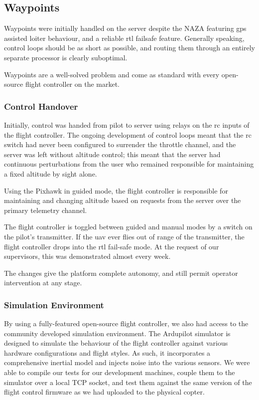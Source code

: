\documentclass[a4paper, 11pt, titlepage]{article}
\begin{document}
    \subsection{Waypoints}
      Waypoints were initially handled on the server despite the NAZA featuring \gls{gps} assisted loiter behaviour, and a reliable \gls{rtl} failsafe feature.  Generally speaking, control loops should be as short as possible, and routing them through an entirely separate processor is clearly suboptimal.
      
      Waypoints are a well-solved problem and come as standard with every open-source flight controller on the market.

    \subsubsection{Control Handover}
      Initially, control was handed from pilot to server using relays on the \gls{rc} inputs of the flight controller.  The ongoing development of control loops meant that the \gls{rc} switch had never been configured to surrender the throttle channel, and the server was left without altitude control;  this meant that the server had continuous perturbations from the user who remained responsible for maintaining a fixed altitude by sight alone.

      Using the Pixhawk \cite{3dr-pixhawk} in guided mode, the flight controller is responsible for maintaining and changing altitude based on requests from the server over the primary telemetry channel.
      
      The flight controller is toggled between guided and manual modes by a switch on the pilot's transmitter.  If the \gls{uav} ever flies out of range of the transmitter, the flight controller drops into the \gls{rtl} fail-safe mode.  At the request of our supervisors, this was demonstrated almost every week.

      The changes give the platform complete autonomy, and still permit operator intervention at any stage.

    \subsubsection{Simulation Environment}
      By using a fully-featured open-source flight controller, we also had access to the community developed simulation environment.  
      The Ardupilot simulator is designed to simulate the behaviour of the flight controller against various hardware configurations and flight styles.  As such, it incorporates a comprehensive inertial model and injects noise into the various sensors.
      We were able to compile our tests for our development machines, couple them to the simulator over a local TCP socket, and test them against the same version of the flight control firmware as we had uploaded to the physical copter.
\end{document}
